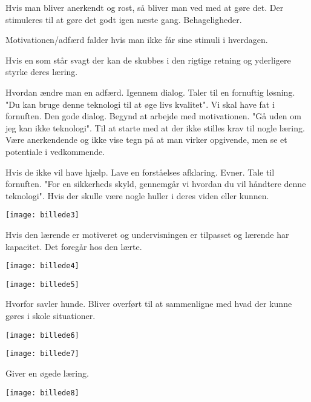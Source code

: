 \documentclass[12pt, letterpaper]{article}
\begin{document}
Hvis man bliver anerkendt og rost, så bliver man ved med at gøre det. Der stimuleres til at gøre det godt igen næste gang. Behageligheder.

Motivationen/adfærd falder hvis man ikke får sine stimuli i hverdagen.


Hvis en som står svagt der kan de skubbes i den rigtige retning og yderligere styrke deres læring.

Hvordan ændre man en adfærd. Igennem dialog. Taler til en fornuftig løsning. "Du kan bruge denne teknologi til at øge livs kvalitet". Vi skal have fat i fornuften. Den gode dialog. Begynd at arbejde med motivationen. "Gå uden om jeg kan ikke teknologi". Til at starte med at der ikke stilles krav til nogle læring. 
Være anerkendende og ikke vise tegn på at man virker opgivende, men se et potentiale i vedkommende.

Hvis de ikke vil have hjælp. Lave en forståelses afklaring. Evner. Tale til fornuften. "For en sikkerheds skyld, gennemgår vi hvordan du vil håndtere denne teknologi". Hvis der skulle være nogle huller i deres viden eller kunnen. 


\begin{center}
\texttt{[image: billede3]}
\end{center}

Hvis den lærende er motiveret og undervisningen er tilpasset og lærende har kapacitet. Det foregår hos den lærte.

\begin{center}
\texttt{[image: billede4]}
\end{center}

\begin{center}
\texttt{[image: billede5]}
\end{center}

Hvorfor savler hunde. Bliver overført til at sammenligne med hvad der kunne gøres i skole situationer. 

\begin{center}
\texttt{[image: billede6]}
\end{center}

\begin{center}
\texttt{[image: billede7]}
\end{center}

Giver en øgede læring.

\begin{center}
\texttt{[image: billede8]}
\end{center}
\end{document}
